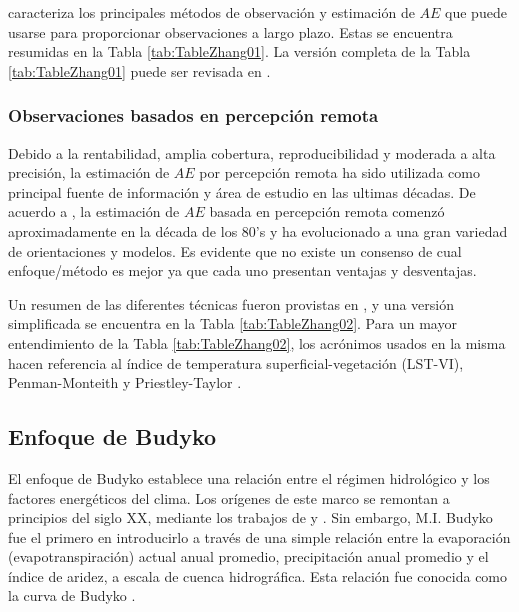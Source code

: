 \documentclass[12pt]{article}
\begin{document}
\citet{wang2012review} caracteriza los principales métodos de observación y estimación de $AE$ que puede usarse para proporcionar observaciones a largo plazo. Estas se encuentra resumidas en la Tabla \ref{tab:TableZhang01}. La versión completa de la Tabla \ref{tab:TableZhang01} puede ser revisada en \citet{wang2012review}.

\vspace{.5cm}


\subsubsection{Observaciones basados en percepción remota}

Debido a la rentabilidad, amplia cobertura, reproducibilidad y moderada a alta precisión, la estimación de $AE$ por percepción remota ha sido utilizada como principal fuente de información y área de estudio en las ultimas décadas. De acuerdo a \citet{zhang2016review}, la estimación de $AE$ basada en percepción remota comenzó aproximadamente en la década de los 80's y ha evolucionado a una gran variedad de orientaciones y modelos. Es evidente que no existe un consenso de cual enfoque/método es mejor ya que cada uno presentan ventajas y desventajas. 

Un resumen de las diferentes técnicas fueron provistas en \citet{zhang2016review}, y una versión simplificada se encuentra en la Tabla \ref{tab:TableZhang02}. Para un mayor entendimiento de la Tabla \ref{tab:TableZhang02}, los acrónimos usados en la misma hacen referencia al índice de temperatura superficial-vegetación (LST-VI), Penman-Monteith \citep[PM;][]{penman1948natural,monteith1965evaporation} y Priestley-Taylor \citep[PT;][]{priestley1972assessment}.

\vspace{.5cm}


\subsection{Enfoque de Budyko}

El enfoque de Budyko establece una relación entre el régimen hidrológico y los factores energéticos del clima. Los orígenes de este marco se remontan a principios del siglo XX, mediante los trabajos de \citet{schreiber1904relationship} y \citet{ol1911evaporation}. Sin embargo, M.I. Budyko fue el primero en introducirlo a través de una simple relación entre la evaporación (evapotranspiración) actual anual promedio, precipitación anual promedio y el índice de aridez, a escala de cuenca hidrográfica. Esta relación fue conocida como la curva de Budyko \citep{budyko1958heat}.
\end{document}
